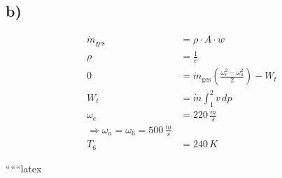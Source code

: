 

\subsection*{b)}

\begin{align*}
    \dot{m}_{\text{ges}} &= \rho \cdot A \cdot w \\
    \rho &= \frac{1}{v} \\
    0 &= \dot{m}_{\text{ges}} \left( \frac{\omega_e^2 - \omega_a^2}{2} \right) - W_t \\
    W_t &= \dot{m} \int_{1}^{2} v \, dp \\
    \omega_e &= 220 \, \frac{m}{s} \\
    \Rightarrow \omega_a = \omega_6 = 500 \, \frac{m}{s} \\
    T_6 &= 240 \, K
\end{align*}

``````latex